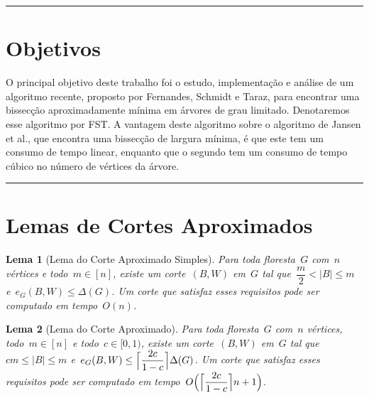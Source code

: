 \documentclass[a0,portrait]{a0poster}
\DeclarePairedDelimiter\ceil{\lceil}{\rceil}
\newtheorem{lem}{Lema}
\begin{document}
\begin{multicols}{3}
\noindent\rule[0.5ex]{\linewidth}{1pt}



\color{Black} %


\section*{Objetivos}

    O principal objetivo deste trabalho foi o estudo, implementação e 
    análise de um algoritmo recente, proposto por Fernandes, Schmidt e 
    Taraz, para encontrar uma bissecção 
    aproximadamente mínima em árvores de grau limitado. Denotaremos
    esse algoritmo por FST. 
    A vantagem deste algoritmo sobre o algoritmo de Jansen et 
    al., que encontra uma bissecção de largura 
    mínima, é que este tem um consumo de tempo linear, enquanto que o 
    segundo tem um consumo de tempo cúbico no número de vértices da 
    árvore. 

\noindent\rule[0.5ex]{\linewidth}{1pt}


\section* {Lemas de Cortes Aproximados}

\begin{lem}[Lema do Corte Aproximado Simples]
    Para toda floresta~$G$ com~$n$ vértices e todo~${m \in [n]}$,
    existe um corte~$(B,W)$ em~$G$ tal 
    que~${\dfrac{m}{2} <|B| \le m}$ e~${e_G(B,W) \le \Delta(G)}$.
    Um corte que satisfaz esses requisitos pode ser computado em
    tempo~$O(n)$.
\end{lem}

\medskip

\begin{lem}[Lema do Corte Aproximado]
    Para toda floresta~$G$ com~$n$ vértices, todo~${m \in [n]}$ e 
    todo~${c \in [0,1)}$, existe um corte~$(B,W)$ em~$G$ tal 
    que~${cm \le |B| \le m}$ 
    e~${e_G(B,W) \le \ceil[\Big]{ \dfrac{2c}{1-c}} \Delta(G)}$.
    Um corte que satisfaz esses requisitos pode ser computado em
    tempo~$O{\Big(\ceil[\Big]{ \dfrac{2c}{1-c}} n+1\Big)}$.
\end{lem}


\end{multicols}
\end{document}
